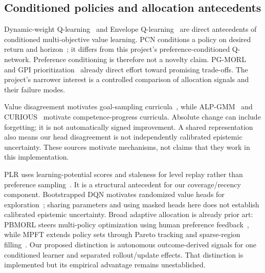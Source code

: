 \subsection{Conditioned policies and allocation antecedents}
Dynamic-weight Q-learning~\cite{abels2019dynamic-weights} and Envelope
Q-learning~\cite{yang2019envelope} are direct antecedents of conditioned
multi-objective value learning. PCN conditions a policy on desired return and
horizon~\cite{reymond2022pcn}; it differs from this project's preference-conditioned
Q-network. Preference conditioning is therefore not a novelty claim.
PG-MORL~\cite{xu2020pgmorl} and GPI prioritization~\cite{alegre2023gpi-prioritization}
already direct effort toward promising trade-offs. The project's narrower
interest is a controlled comparison of allocation signals and their failure modes.

Value disagreement motivates goal-sampling curricula~\cite{zhang2020value-disagreement},
while ALP-GMM~\cite{portelas2020alp-gmm} and CURIOUS~\cite{colas2019curious}
motivate competence-progress curricula. Absolute change can include forgetting;
it is not automatically signed improvement. A shared representation also means
our head disagreement is not independently calibrated epistemic uncertainty.
These sources motivate mechanisms, not claims that they work in this implementation.

PLR uses learning-potential scores and staleness for level replay rather than
preference sampling~\cite{jiang2021plr}. It is a structural antecedent for our
coverage/recency component. Bootstrapped DQN motivates randomized value heads
for exploration~\cite{osband2016bootstrapped-dqn}; sharing parameters and using
masked heads here does not establish calibrated epistemic uncertainty.
Broad adaptive allocation is already prior art: PBMORL steers multi-policy
optimization using human preference feedback~\cite{hu2026pbmorl}, while MPFT
extends policy sets through Pareto tracking and sparse-region filling~\cite{zhao2026mpft}.
Our proposed distinction is autonomous outcome-derived signals for one
conditioned learner and separated rollout/update effects. That distinction is
implemented but its empirical advantage remains unestablished.

